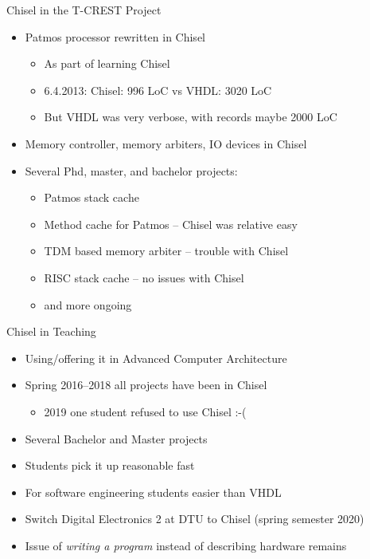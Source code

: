 \documentclass[xcolor=pdflatex,dvipsnames,table]{beamer}
\begin{document}
\begin{frame}[fragile]{Chisel in the T-CREST Project}
\begin{itemize}
\item Patmos processor rewritten in Chisel
\begin{itemize}
\item As part of learning Chisel
\item 6.4.2013: Chisel: 996 LoC vs VHDL: 3020 LoC
\item But VHDL was very verbose, with records maybe 2000 LoC
\end{itemize}
\item Memory controller, memory arbiters, IO devices in Chisel
\item Several Phd, master, and bachelor projects:
\begin{itemize}
\item Patmos stack cache
\item Method cache for Patmos -- Chisel was relative easy
\item TDM based memory arbiter -- trouble with Chisel
\item RISC stack cache -- no issues with Chisel
\item and more ongoing 
\end{itemize}
\end{itemize}
\end{frame}

\begin{frame}[fragile]{Chisel in Teaching}
\begin{itemize}
\item Using/offering it in Advanced Computer Architecture
\item Spring 2016--2018 all projects have been in Chisel
\begin{itemize}
\item 2019 one student refused to use Chisel :-(
\end{itemize}
\item Several Bachelor and Master projects
\item Students pick it up reasonable fast
\item For software engineering students easier than VHDL
\item Switch Digital Electronics 2 at DTU to Chisel (spring semester 2020)
\item Issue of \emph{writing a program} instead of describing hardware remains
\end{itemize}
\end{frame}
\end{document}
